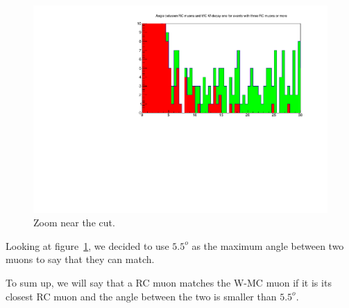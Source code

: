 \begin{figure} [htp]
\centering
\includegraphics[scale=0.7]{04_muonsMatchAngleCut.pdf}
\caption{Zoom near the cut.}
\label{04_muonsMatchAngleCut}
\end{figure}

Looking at figure~\ref{04_muonsMatchAngleCut}, we decided to use $5.5^o$ as the maximum angle between two muons to say that they can match.

To sum up, we will say that a RC muon matches the W-MC muon if it is its closest RC muon and the angle between the two is smaller than $5.5^o$.